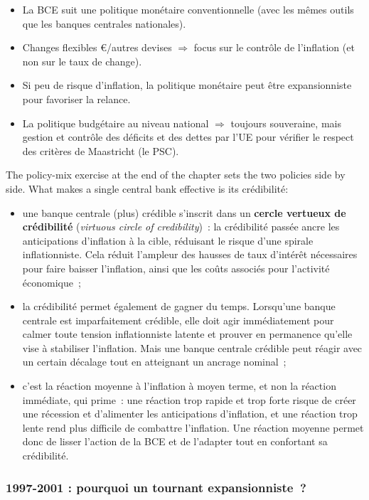 \begin{itemize}
  \item La BCE suit une politique monétaire conventionnelle (avec les mêmes outils que
    les banques centrales nationales).
  \item Changes flexibles €/autres devises $\Rightarrow$ focus sur le contrôle de
    l'inflation (et non sur le taux de change).
  \item Si peu de risque d'inflation, la politique monétaire peut être expansionniste
    pour favoriser la relance.
  \item La politique budgétaire au niveau national $\Rightarrow$ toujours souveraine,
    mais gestion et contrôle des déficits et des dettes par l'UE pour vérifier le
    respect des critères de Maastricht (le PSC).
\end{itemize}
The policy-mix exercise at the end of the chapter sets the two policies side by side.
What makes a single central bank effective is its crédibilité:
\begin{itemize}
  \item une banque centrale (plus) crédible s'inscrit dans un \textbf{cercle vertueux de
    crédibilité} (\textit{virtuous circle of credibility})~: la crédibilité passée ancre
    les anticipations d'inflation à la cible, réduisant le risque d'une spirale
    inflationniste. Cela réduit l'ampleur des hausses de taux d'intérêt nécessaires
    pour faire baisser l'inflation, ainsi que les coûts associés pour l'activité
    économique~;
  \item la crédibilité permet également de gagner du temps. Lorsqu'une banque centrale
    est imparfaitement crédible, elle doit agir immédiatement pour calmer toute tension
    inflationniste latente et prouver en permanence qu'elle vise à stabiliser
    l'inflation. Mais une banque centrale crédible peut réagir avec un certain décalage
    tout en atteignant un ancrage nominal~;
  \item c'est la réaction moyenne à l'inflation à moyen terme, et non la réaction
    immédiate, qui prime~: une réaction trop rapide et trop forte risque de créer une
    récession et d'alimenter les anticipations d'inflation, et une réaction trop lente
    rend plus difficile de combattre l'inflation. Une réaction moyenne permet donc de
    lisser l'action de la BCE et de l'adapter tout en confortant sa crédibilité.
\end{itemize}

\subsubsection{1997-2001 : pourquoi un tournant expansionniste~?}

